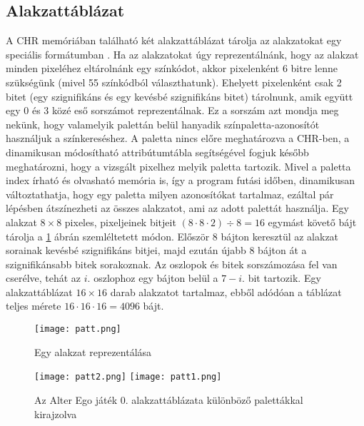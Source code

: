 \subsection{Alakzattáblázat}

A CHR memóriában található két alakzattáblázat tárolja  az alakzatokat egy speciális formátumban \cite{ppuref}. Ha az alakzatokat úgy reprezentálnánk, hogy az alakzat minden pixeléhez eltárolnánk egy színkódot, akkor pixelenként 6 bitre lenne szükségünk (mivel 55 színkódból választhatunk). Ehelyett pixelenként csak 2 bitet (egy szignifikáns és egy kevésbé szignifikáns bitet) tárolnunk, amik együtt egy 0 és 3 közé eső sorszámot reprezentálnak. Ez a sorszám azt mondja meg nekünk, hogy valamelyik palettán belül hanyadik színpaletta-azonosítót használjuk a színkereséshez. A paletta nincs előre meghatározva a CHR-ben, a dinamikusan módosítható attribútumtábla segítségével fogjuk később meghatározni, hogy a vizsgált pixelhez melyik paletta tartozik. Mivel a paletta index írható és olvasható memória is, így a program futási időben, dinamikusan változtathatja, hogy egy paletta milyen azonosítókat tartalmaz, ezáltal pár lépésben átszínezheti az összes alakzatot, ami az adott palettát használja.
Egy alakzat $8\times 8$ pixeles, pixeljeinek bitjeit $(8\cdot8\cdot2)\div8 = 16$ egymást követő bájt tárolja a \ref{fig:patt} ábrán szemléltetett módon.
Először 8 bájton keresztül az alakzat sorainak kevésbé szignifikáns bitjei, majd ezután újabb 8 bájton át a szignifikánsabb bitek sorakoznak. Az oszlopok és bitek sorszámozása fel van cserélve, tehát az $i.$ oszlophoz egy bájton belül a $7-i.$ bit tartozik.  
Egy alakzattáblázat $16\times 16$ darab alakzatot tartalmaz, ebből adódóan a táblázat teljes mérete $16\cdot16\cdot16 = 4096$ bájt.

\begin{figure}[H]
	\centering
	\texttt{[image: patt.png]}
	\caption{Egy alakzat reprezentálása}
	\label{fig:patt}
\end{figure}


\begin{figure}[H]
	\centering
	\texttt{[image: patt2.png]}
	\hspace{5pt}
	\texttt{[image: patt1.png]}
	\caption{Az Alter Ego játék 0. alakzattáblázata különböző palettákkal kirajzolva}
\end{figure}

